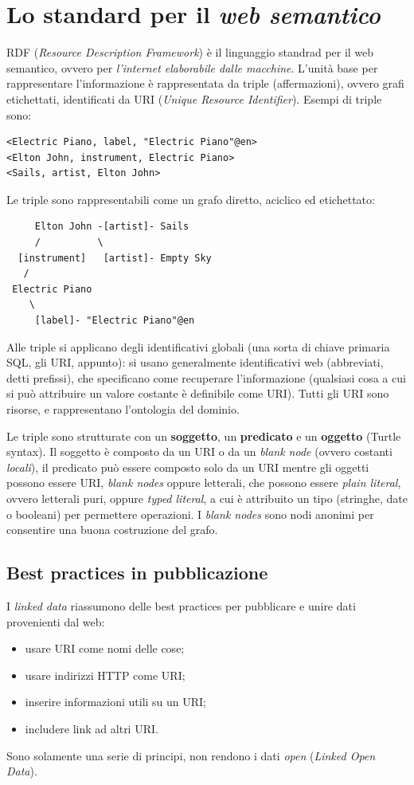 \documentclass[11pt]{article}
\begin{document}
\section{Lo standard per il \textit{web semantico}}
RDF (\textit{Resource Description Framework}) è il linguaggio standrad per il web semantico, ovvero per \textit{l'internet elaborabile dalle macchine}.
L'unità base per rappresentare l'informazione è rappresentata da triple (affermazioni), ovvero grafi etichettati, identificati da URI (\textit{Unique Resource Identifier}).
Esempi di triple sono:
\begin{verbatim}
<Electric Piano, label, "Electric Piano"@en>
<Elton John, instrument, Electric Piano>
<Sails, artist, Elton John>
\end{verbatim}
Le triple sono rappresentabili come un grafo diretto, aciclico ed etichettato:
\begin{verbatim}
     Elton John -[artist]- Sails
     /          \
  [instrument]   [artist]- Empty Sky
   /
 Electric Piano 
    \
     [label]- "Electric Piano"@en
\end{verbatim}
Alle triple si applicano degli identificativi globali (una sorta di chiave primaria SQL, gli URI, appunto): si usano generalmente identificativi web (abbreviati, detti prefissi), che specificano come recuperare l'informazione (qualsiasi cosa a cui si può attribuire un valore costante è definibile come URI).
Tutti gli URI sono risorse, e rappresentano l'ontologia del dominio.

Le triple sono strutturate con un \textbf{soggetto}, un \textbf{predicato} e un \textbf{oggetto} (Turtle syntax).
Il soggetto è composto da un URI o da un \textit{blank node} (ovvero costanti \textit{locali}), il predicato può essere composto solo da un URI mentre gli oggetti possono essere URI, \textit{blank nodes} oppure letterali, che possono essere \textit{plain literal}, ovvero letterali puri, oppure \textit{typed literal}, a cui è attribuito un tipo (stringhe, date o booleani) per permettere operazioni.
I \textit{blank nodes} sono nodi anonimi per consentire una buona costruzione del grafo.

\subsection{Best practices in pubblicazione}
I \textit{linked data} riassumono delle best practices per pubblicare e unire dati provenienti dal web:
\begin{itemize}
  \item usare URI come nomi delle cose;
  \item usare indirizzi HTTP come URI;
  \item inserire informazioni utili su un URI;
  \item includere link ad altri URI.
\end{itemize}
Sono solamente una serie di principi, non rendono i dati \textit{open} (\textit{Linked Open Data}).
\newline
\end{document}
